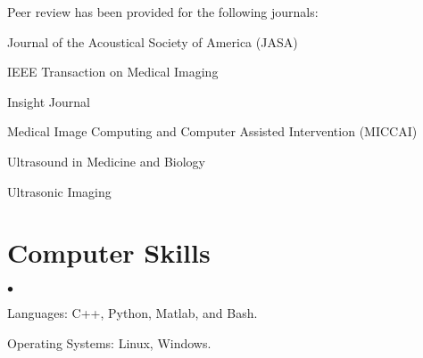 \documentclass[margin,line]{res}
\newenvironment{list1}{
  \begin{list}{\ding{113}}{%
      \setlength{\itemsep}{0in}
      \setlength{\parsep}{0in} \setlength{\parskip}{0in}
      \setlength{\topsep}{0in} \setlength{\partopsep}{0in} 
      \setlength{\leftmargin}{0.17in}}}{\end{list}}
\newenvironment{list2}{
  \begin{list}{$\bullet$}{%
      \setlength{\itemsep}{0in}
      \setlength{\parsep}{0in} \setlength{\parskip}{0in}
      \setlength{\topsep}{0in} \setlength{\partopsep}{0in} 
      \setlength{\leftmargin}{0.2in}}}{\end{list}}
\begin{document}
\begin{resume}
Peer review has been provided for the following journals:

\begin{list1}
\item[] Journal of the Acoustical Society of America (JASA)
\item[] IEEE Transaction on Medical Imaging
\item[] Insight Journal
\item[] Medical Image Computing and Computer Assisted Intervention (MICCAI)
\item[] Ultrasound in Medicine and Biology
\item[] Ultrasonic Imaging
\end{list1}

%
%
%
%

%
\section{\sc Computer Skills}
\begin{list2}
\item Languages:  C++, Python, Matlab, and Bash.
\item Operating Systems:  Linux, Windows.\\
\end{list2}
\vspace*{-.15in}


\end{resume}
\end{document}

